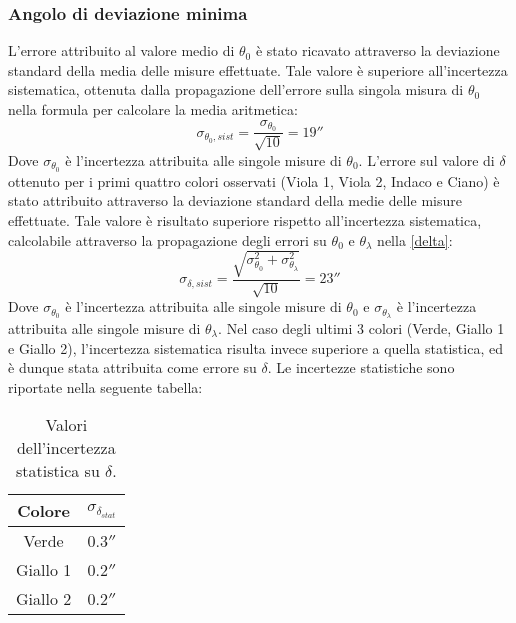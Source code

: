 \documentclass[]{article}
\begin{document}
    \subsubsection{Angolo di deviazione minima}
    L'errore attribuito al valore medio di $\theta_0$ è stato ricavato attraverso la deviazione standard della media delle misure effettuate. Tale valore è superiore all'incertezza sistematica, ottenuta dalla propagazione dell'errore sulla singola misura di $\theta_0$ nella formula per calcolare la media aritmetica:
    \begin{equation}
        \label{theta0-err-sist}
        \sigma_{\theta_0,sist} = \frac{\sigma_{\theta_0}}{\sqrt{10}} = 19''
    \end{equation}
    Dove $\sigma_{\theta_0}$ è l'incertezza attribuita alle singole misure di $\theta_0$.
    L'errore sul valore di $\delta$ ottenuto per i primi quattro colori osservati (Viola 1, Viola 2, Indaco e Ciano) è stato attribuito attraverso la deviazione standard della medie delle misure effettuate. Tale valore è risultato superiore rispetto all'incertezza sistematica, calcolabile attraverso la propagazione degli errori su $\theta_0$ e $\theta_{\lambda}$ nella \ref{delta}:
    \begin{equation}
        \label{delta-err-sist}
        \sigma_{\delta, sist}= \frac{\sqrt{ \sigma_{\theta_0}^2 + \sigma_{\theta_{\lambda}}^2 }}{\sqrt{10}} = 23''
    \end{equation}
    Dove $\sigma_{\theta_0}$ è l'incertezza attribuita alle singole misure di $\theta_0$ e $\sigma_{\theta_{\lambda}}$ è l'incertezza attribuita alle singole misure di $\theta_{\lambda}$.
    Nel caso degli ultimi 3 colori (Verde, Giallo 1 e Giallo 2), l'incertezza sistematica risulta invece superiore a quella statistica, ed è dunque stata attribuita come errore su $\delta$. Le incertezze statistiche sono riportate nella seguente tabella:
    \begin{table} [H]
        \centering
        \begin{tabular}{||c|c||}
            \hline
            Colore & $\sigma_{\delta_{stat}}$\\
            \hline \hline
            Verde & $ 0.3'' $ \\\hline
            Giallo 1 & $ 0.2'' $ \\\hline
            Giallo 2 & $ 0.2''  $ \\\hline
        \end{tabular}
        \caption{Valori dell'incertezza statistica su $\delta$.}
        \label{d-err-stat}
    \end{table}
    \label{par:dev_min_err}
\end{document}
